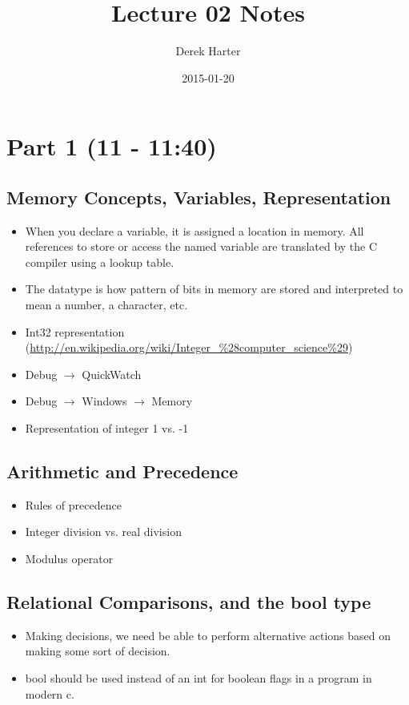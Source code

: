 \documentclass[11pt]{article}
\title{Lecture 02 Notes}
\author{Derek Harter}
\date{2015-01-20}
\begin{document}
\maketitle


\section*{Part 1 (11 - 11:40)}
\label{sec-1}
\subsection*{Memory Concepts, Variables, Representation}
\label{sec-1-1}


\begin{itemize}
\item When you declare a variable, it is assigned a location in memory.
  All references to store or access the named variable are translated
  by the C compiler using a lookup table.
\item The datatype is how pattern of bits in memory are stored and
  interpreted to mean a number, a character, etc.
\item Int32 representation (\href{http://en.wikipedia.org/wiki/Integer_%28computer_science%29}{http://en.wikipedia.org/wiki/Integer\_\%28computer\_science\%29})
\item Debug $\rightarrow$ QuickWatch
\item Debug $\rightarrow$ Windows $\rightarrow$ Memory
\item Representation of integer 1 vs. -1
\end{itemize}
\subsection*{Arithmetic and Precedence}
\label{sec-1-2}

\begin{itemize}
\item Rules of precedence
\item Integer division vs. real division
\item Modulus operator
\end{itemize}
\subsection*{Relational Comparisons, and the bool type}
\label{sec-1-3}

\begin{itemize}
\item Making decisions, we need be able to perform alternative actions
  based on making some sort of decision.
\item bool should be used instead of an int for boolean flags in a program in modern c.
\end{itemize}
\end{document}
